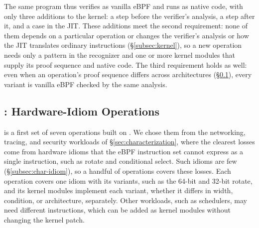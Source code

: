 The same program thus verifies as vanilla eBPF and runs as native code, with only three additions to the kernel: a step before the verifier's analysis, a step after it, and a case in the JIT.
These additions meet the second requirement: none of them depends on a particular operation or changes the verifier's analysis or how the JIT translates ordinary instructions (\S\ref{subsec:kernel}), so a new operation needs only a pattern in the recognizer and one or more kernel modules that supply its proof sequence and native code.
The third requirement holds as well: even when an operation's proof sequence differs across architectures (\S\ref{sec:lang}), every variant is vanilla eBPF checked by the same analysis.

\subsection{\lang: Hardware-Idiom Operations}
\label{sec:lang}

\lang is a first set of seven operations built on \tool.
We chose them from the networking, tracing, and security workloads of \S\ref{sec:characterization}, where the clearest losses come from hardware idioms that the eBPF instruction set cannot express as a single instruction, such as rotate and conditional select.
Such idioms are few (\S\ref{subsec:char-idiom}), so a handful of operations covers these losses.
Each \lang operation covers one idiom with its variants, such as the 64-bit and 32-bit rotate, and its kernel modules implement each variant, whether it differs in width, condition, or architecture, separately.
Other workloads, such as schedulers, may need different instructions, which can be added as kernel modules without changing the kernel patch.

